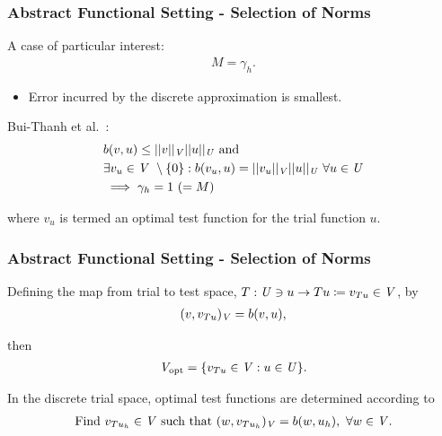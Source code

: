 \begin{frame}
\frametitle{Abstract Functional Setting - Selection of Norms}

A case of particular interest:
\begin{align} \label{eq:equal_m_gamma}
M = \gamma_h.
\end{align}

\begin{itemize}
  \item Error incurred by the discrete approximation is smallest.
\end{itemize}
\vspace{5mm}

Bui-Thanh et al.~\cite[Theorem ]{BuiThanh2013}:
\begin{align} \label{eq:bui_thanh_2-6}
 &  b(v,u) \le ||v||_{\mathit{{{V}}}} ||u||_{\mathit{{{U}}}}\ \text{and}\ \\
 & \exists v_u \in \mathit{{{V}}}\ \setminus \{0\} :
b(v_u,u) = ||v_u||_{\mathit{{{V}}}} ||u||_{\mathit{{{U}}}}\ \forall u \in \mathit{{{U}}} \\
& \implies \gamma_h = 1\ (= M)
\end{align}

where $v_u$ is termed an optimal test function for the trial function $u$.

\end{frame}

\begin{frame}
\frametitle{Abstract Functional Setting - Selection of Norms}

Defining the map from trial to test space,
$T: \mathit{{{U}}} \ni u \rightarrow Tu \coloneqq v_{Tu} \in \mathit{{{V}}} $, by
\begin{align}
(v, v_{Tu})_{\mathit{{{V}}}} = b(v,u),
\end{align}

then
\begin{align} \label{eq:def_discrete_test_space_alt}
\mathit{{{V}}}_\text{opt} = \{ v_{T u} \in \mathit{{{V}}} : u \in \mathit{{{U}}} \}.
\end{align}

In the discrete trial space, optimal test functions are determined according to
\begin{align} \label{eq:auxiliary_opt_v}
\text{Find}\ v_{T u_h} \in \mathit{{{V}}}\ \text{such that}\
(w,v_{T u_h})_{\mathit{{{V}}}} = b(w,u_h),\ \forall w \in \mathit{{{V}}}.
\end{align}

\end{frame}
